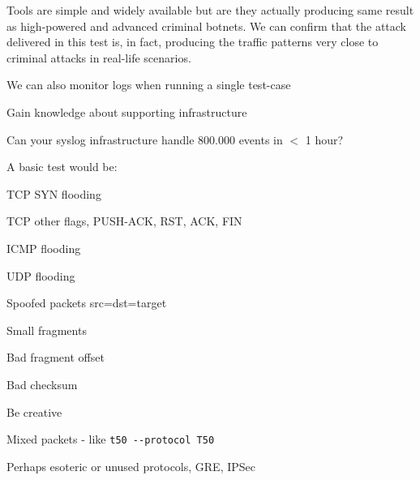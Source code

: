 \documentclass[Screen16to9,17pt]{foils}
\begin{document}

Tools are simple and widely available but are they actually producing same result as high-powered and advanced criminal botnets. We can confirm that the attack delivered in this test is, in fact, producing the traffic patterns very close to criminal attacks in real-life scenarios.

\begin{list2}
\item We can also monitor logs when running a single test-case
\item Gain knowledge about supporting infrastructure
\item Can your syslog infrastructure handle 800.000 events in $<$ 1 hour?
\end{list2}



A basic test would be:
\begin{list2}
\item TCP SYN flooding
\item TCP other flags, PUSH-ACK, RST, ACK, FIN
\item ICMP flooding
\item UDP flooding
\item Spoofed packets src=dst=target \smiley
\item Small fragments
\item Bad fragment offset
\item Bad checksum
\item Be creative
\item Mixed packets - like \verb+t50 --protocol T50+
\item Perhaps esoteric or unused protocols, GRE, IPSec
\end{list2}

\end{document}
